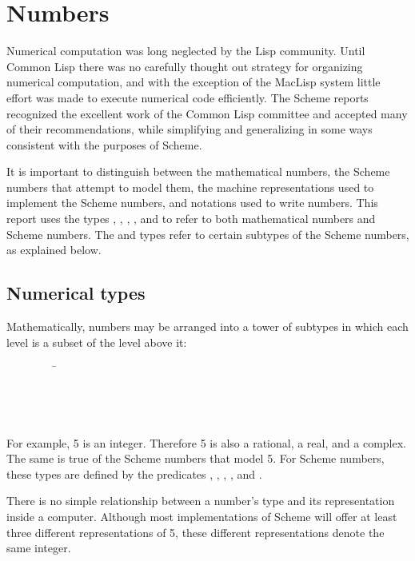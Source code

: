 \chapter{Numbers}
\label{numbertypeschapter}

Numerical computation was long neglected by the Lisp
community.  Until Common Lisp there was no carefully thought out
strategy for organizing numerical computation, and with the exception of
the MacLisp system \cite{Pitman83} little effort was made to
execute numerical code efficiently.
The Scheme reports recognized the excellent work
of the Common Lisp committee and accepted many of their recommendations,
while simplifying and generalizing in some ways
consistent with the purposes of Scheme.

It is important to distinguish between the mathematical numbers, the
Scheme numbers that attempt to model them, the machine representations
used to implement the Scheme numbers, and notations used to write numbers.
This report uses the types , , ,
, and  to refer to both mathematical numbers
and Scheme numbers.
The  and  types refer to certain
subtypes of the Scheme numbers, as explained below.

\section{Numerical types}
\label{numericaltypes}

\vest Mathematically, numbers may be arranged into a tower of subtypes
in which each level is a subset of the level above it:
\begin{tabbing}
\ \ \ \ \ \ \ \ \ \= \\
\>  \\
\>  \\
\>  \\
\>  
\end{tabbing}

For example, 5 is an integer.  Therefore 5 is also a rational,
a real, and a complex.  The same is true of the Scheme numbers
that model 5.  For Scheme numbers, these types are defined by the
predicates , , , ,
and .

There is no simple relationship between a number's type and its
representation inside a computer.  Although most implementations of
Scheme will offer at least three different representations of 5, these
different representations denote the same integer.

